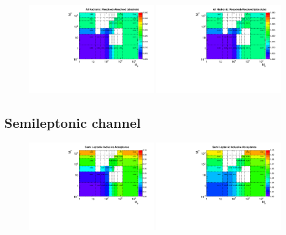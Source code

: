 \begin{figure}[htbp]
  \includegraphics[width=0.48\textwidth]{figures/ttDM_S_allhad_2D_R15_rr.pdf}
  \includegraphics[width=0.48\textwidth]{figures/ttDM_PS_allhad_2D_R15_rr.pdf}
  \caption{}
  \label{fig:hadronic_acc15}
\end{figure}

\subsection{Semileptonic channel}
\label{subsec:app_acc_semilept}

\begin{figure}[htbp]
  \centering
  \includegraphics[width=0.48\textwidth]{figures/ttDM_S_semilep_2D_acc.pdf}
  \includegraphics[width=0.48\textwidth]{figures/ttDM_PS_semilep_2D_acc.pdf}
  \caption{}
  \label{fig:semilept_acc}
\end{figure}

